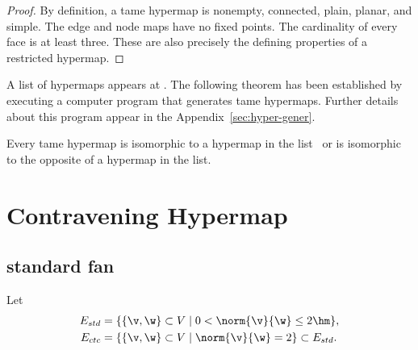 \begin{proof}
  By definition, a tame hypermap is nonempty, connected, plain,
  planar, and simple.  The edge and node maps
  have no fixed points.  The cardinality of every face is at least
  three.  These are also precisely the defining properties of a restricted
  hypermap.
\end{proof}


A list of hypermaps appears at \cite{website:FlyspeckProject}.  The following
theorem has been established by executing a computer program that generates
tame hypermaps.  Further details about this program appear in
the Appendix~\ref{sec:hyper-gener}.

%

\begin{theorem}
  \label{theorem:classification} Every tame hypermap is isomorphic to
  a hypermap in the list~\cite{website:FlyspeckProject} or is
  isomorphic to the opposite of a hypermap in the list.
\end{theorem}



%
%

\section{Contravening Hypermap}

\subsection{standard fan}

Let
\begin{align}\label{eqn:fan-edge}
E_{std} &= \{\{\v,\w\}\subset V\mid 0 < \norm{\v}{\w}\le 2\hm \},\\
E_{ctc} &= \{ \{\v,\w\}\subset V\mid \norm{\v}{\w}= 2 \}\subset E_{std}.
\end{align}

